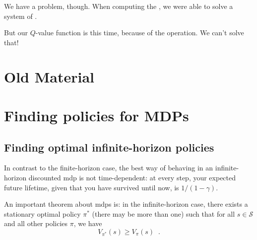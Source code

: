         We have a problem, though. When computing the , we were able to solve a system of .

        But our $Q$-value function is  this time, because of the  operation. We can't solve that!

    

        

    

        


        

        

        

        

    




\pagebreak

\section{Old Material}



\section{Finding policies for MDPs}


\subsection{Finding optimal infinite-horizon policies}
\label{sec:mdp_infinite_horizon_optimal}

In contrast to the finite-horizon case, the best way of behaving in an
infinite-horizon discounted {\sc mdp} is not time-dependent: at every
step, your expected future lifetime, given that you have survived
until now, is $1 / (1 - \gamma)$.
%

An important theorem about {\sc mdp}s is: in the infinite-horizon case, there exists a stationary
optimal policy $\pi^*$ (there may be more than one) such that for all
$s \in \mathcal S$ and all other policies $\pi$, we have 
\begin{equation}
 V_{\pi^*}(s) \ge V_{\pi}(s) \;\;.
\end{equation}


